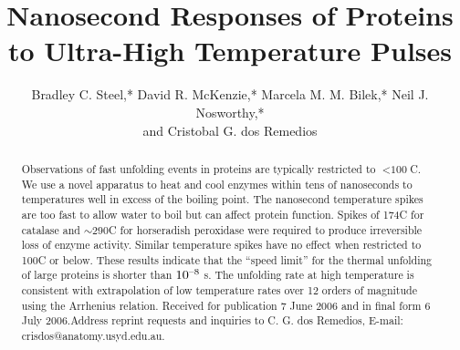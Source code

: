 \documentclass{biophys_letter}
\begin{document}

\setcounter{page}{1} %
\title{Nanosecond Responses of Proteins to Ultra-High Temperature Pulses}


\author{Bradley C. Steel,* David R. McKenzie,* Marcela M. M. Bilek,* Neil J. Nosworthy,*\\ and Cristobal G. dos Remedios{\authdagger}}

\address{*School of Physics and {\addrdagger}Bosch Institute, The University of Sydney, Sydney, NSW 2006, Australia}

\maketitle

\pagestyle{headings}





\begin{abstract}
{Observations of fast unfolding events in proteins are typically restricted to ${<}\mbox{100}$\textdegree C. We use a novel apparatus to heat and cool enzymes within tens of nanoseconds to temperatures well in excess of the boiling point. The nanosecond temperature spikes are too fast to allow water to boil but can affect protein function. Spikes of 174\textdegree C for catalase and ${\sim}\mbox{290}$\textdegree C for horseradish peroxidase were required to produce irreversible loss of enzyme activity. Similar temperature spikes have no effect when restricted to 100\textdegree C or below. These results indicate that the ``speed limit'' for the thermal unfolding of large proteins is shorter than $\mbox{10}{\textsuperscript{--8}}$ s. The unfolding rate at high temperature is consistent with extrapolation of low temperature rates over 12 orders of magnitude using the Arrhenius relation.}
{Received for publication 7 June 2006 and in final form 6 July 2006.}{Address reprint requests and inquiries to C. G. dos Remedios, E-mail: crisdos@anatomy.usyd.edu.au.}
\end{abstract}
\end{document}
